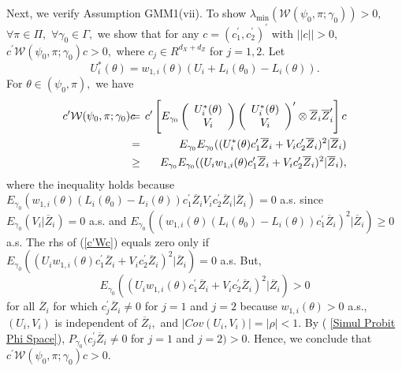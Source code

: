 \documentclass[12pt,thmsb,titlepage,final,oneside,letterpaper]{article}
\begin{document}
Next, we verify Assumption GMM1(vii). To show $\lambda _{\min }(\mathcal{W}%
(\psi _{0},\pi ;\gamma _{0}))>0,$ $\forall \pi \in \Pi ,$ $\forall \gamma
_{0}\in \Gamma ,$ we show that for any $c=(c_{1}^{\prime },c_{2}^{\prime
})^{\prime }$ with $||c||>0,$ $c^{\prime }\mathcal{W}(\psi _{0},\pi ;\gamma
_{0})c>0,$ where $c_{j}\in R^{d_{X}+d_{Z}}$ for $j=1,2.$ Let%
\begin{equation}
U_{i}^{\ast }(\theta )=w_{1,i}(\theta )(U_{i}+L_{i}(\theta
_{0})-L_{i}(\theta )).  \label{GMM1(vii) 1}
\end{equation}%
For $\theta \in (\psi _{0},\pi ),$ we have%
\begin{eqnarray}
c^{\prime }\mathcal{W}(\psi _{0},\pi ;\gamma _{0})c\hspace{-0.08in} &=&%
\hspace{-0.08in}c^{\prime }\left[ E_{\gamma _{0}}\left( 
\begin{array}{c}
U_{i}^{\ast }(\theta ) \\ 
V_{i}%
\end{array}%
\right) \left( 
\begin{array}{c}
U_{i}^{\ast }(\theta ) \\ 
V_{i}%
\end{array}%
\right) ^{\prime }\otimes \overline{Z}_{i}\overline{Z}_{i}^{\prime }\right] c
\notag \\
&=&\hspace{-0.08in}E_{\gamma _{0}}E_{\gamma _{0}}((U_{i}^{\ast }(\theta
)c_{1}^{\prime }\overline{Z}_{i}+V_{i}c_{2}^{\prime }\overline{Z}_{i})^{2}|%
\overline{Z}_{i})  \notag \\
&\geq &\hspace{-0.08in}E_{\gamma _{0}}E_{\gamma _{0}}((U_{i}w_{1,i}(\theta
)c_{1}^{\prime }\overline{Z}_{i}+V_{i}c_{2}^{\prime }\overline{Z}_{i})^{2}|%
\overline{Z}_{i}),  \label{c'Wc}
\end{eqnarray}%
where the inequality holds because $E_{\gamma _{0}}(w_{1,i}(\theta
)(L_{i}(\theta _{0})-L_{i}(\theta ))c_{1}^{\prime }\overline{Z}%
_{i}V_{i}c_{2}^{\prime }\overline{Z}_{i}|\overline{Z}_{i})=0$ a.s. since $%
E_{\gamma _{0}}(V_{i}|\overline{Z}_{i})=0$ a.s. and $E_{\gamma
_{0}}((w_{1,i}(\theta )(L_{i}(\theta _{0})-L_{i}(\theta ))c_{1}^{\prime }%
\overline{Z}_{i})^{2}|\overline{Z}_{i})\geq 0$ a.s. The rhs of (\ref{c'Wc})
equals zero only if $E_{\gamma _{0}}((U_{i}w_{1,i}(\theta )c_{1}^{\prime }%
\overline{Z}_{i}+\allowbreak V_{i}c_{2}^{\prime }\overline{Z}_{i})^{2}|%
\overline{Z}_{i})=0$ a.s. But,%
\begin{equation}
E_{\gamma _{0}}((U_{i}w_{1,i}(\theta )c_{1}^{\prime }\overline{Z}%
_{i}+V_{i}c_{2}^{\prime }\overline{Z}_{i})^{2}|\overline{Z}_{i})>0
\label{GMM1(vii) 3}
\end{equation}%
for all $\overline{Z}_{i}$ for which $c_{j}^{\prime }\overline{Z}_{i}\neq 0$
for $j=1$ and $j=2$ because $w_{1,i}(\theta )>0$ a.s., $(U_{i},V_{i})$ is
independent of $\overline{Z}_{i},$ and $|Cov(U_{i},V_{i})|=|\rho |<1.$ By (%
\ref{Simul Probit Phi Space}), $P_{\gamma _{0}}(c_{j}^{\prime }\overline{Z}%
_{i}\neq 0$ for $j=1$ and $j=2)>0.$ Hence, we conclude that $c^{\prime }%
\mathcal{W}(\psi _{0},\pi ;\gamma _{0})c>0.$
\end{document}
